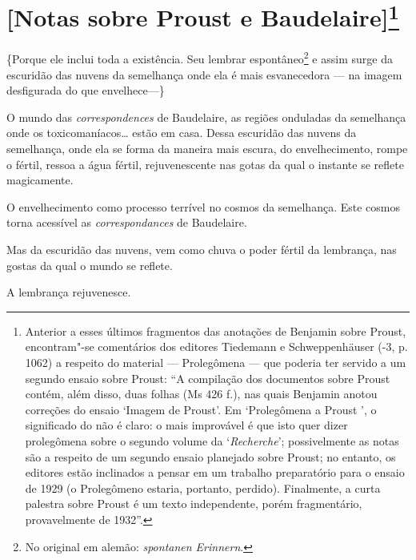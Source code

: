 \section{{[}Notas sobre Proust e Baudelaire{]}\protect\footnote{\uppercase{A}nterior a esses
  últimos fragmentos das anotações de \uppercase{B}enjamin sobre \uppercase{P}roust,
  encontram"-se comentários dos editores \uppercase{T}iedemann e \uppercase{S}chweppenhäuser
  (-3, p. 1062) a respeito do material --- \uppercase{P}rolegômena ---
  que poderia ter servido a um segundo ensaio sobre \uppercase{P}roust: ``\uppercase{A}
  compilação dos documentos sobre \uppercase{P}roust contém, além disso, duas folhas
  (\uppercase{M}s 426 f.), nas quais \uppercase{B}enjamin anotou correções do ensaio
  `\uppercase{I}magem de \uppercase{P}roust'. \uppercase{E}m `\uppercase{P}rolegômena a \uppercase{P}roust
  ', o significado do  não é claro: o mais improvável é que isto
  quer dizer prolegômena sobre o segundo volume da `\emph{\uppercase{R}echerche}';
  possivelmente as notas são a respeito de um segundo ensaio planejado
  sobre \uppercase{P}roust; no entanto, os editores estão inclinados a pensar em um
  trabalho preparatório para o ensaio de 1929 (o \uppercase{P}rolegômeno  estaria,
  portanto, perdido). \uppercase{F}inalmente, a curta palestra sobre \uppercase{P}roust é um
  texto independente, porém fragmentário, provavelmente de 1932''. \versal{[N. E.]}}}

\{Porque ele inclui toda a existência. Seu lembrar espontâneo\footnote{No original em alemão: \emph{spontanen Erinnern}. \versal{[N. T.]}} e assim surge da escuridão das
nuvens da semelhança onde ela é mais esvanecedora --- na imagem
desfigurada do que envelhece---\}

O mundo das \emph{correspondences} de Baudelaire, as regiões onduladas
da semelhança onde os toxicomaníacos\ldots{} estão em casa. Dessa escuridão
das nuvens da semelhança, onde ela se forma da maneira mais escura, do
envelhecimento, rompe o fértil, ressoa a água fértil, rejuvenescente nas
gotas da qual o instante se reflete magicamente.

O envelhecimento como processo terrível no cosmos da semelhança. Este
cosmos torna acessível as \emph{correspondances} de Baudelaire.

Mas da escuridão das nuvens, vem como chuva o poder fértil da lembrança,
nas gostas da qual o mundo se reflete.

A lembrança rejuvenesce.

